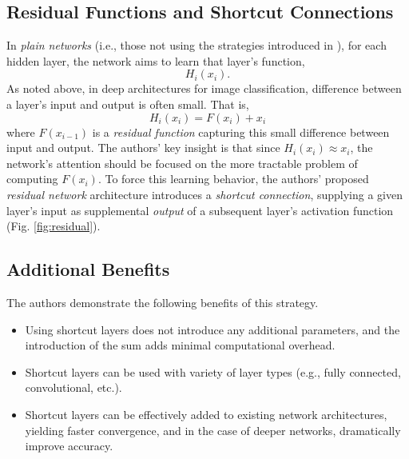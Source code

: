\documentclass[10pt]{article}
\begin{document}
\subsection*{Residual Functions and Shortcut Connections}
In \textit{plain networks} (i.e., those not using the strategies introduced in \cite{7780459}), for each hidden layer, the network aims to learn that layer's function,
\[
    H_i(x_{i}).
\]
As noted above, in deep architectures for image classification, difference between a layer's input and output is often small. That is,
\[
    H_i(x_{i}) = F(x_{i}) + x_{i}
\]
where \(F(x_{i-1})\) is a \textit{residual function} capturing this small difference between input and output. The authors' key insight is that since \(H_i(x_{i}) \approx x_{i}\), the network's attention should be focused on the more tractable problem of computing \(F(x_{i})\). To force this learning behavior, the authors' proposed \textit{residual network} architecture introduces a \textit{shortcut connection}, supplying a given layer's input as supplemental \textit{output} of a subsequent layer's activation function (Fig. \ref*{fig:residual}).


\subsection*{Additional Benefits}
The authors demonstrate the following benefits of this strategy.
\begin{itemize}
    \item Using shortcut layers does not introduce any additional parameters, and the introduction of the sum adds minimal computational overhead.
    \item Shortcut layers can be used with variety of layer types (e.g., fully connected, convolutional, etc.).
    \item Shortcut layers can be effectively added to existing network architectures, yielding faster convergence, and in the case of deeper networks, dramatically improve accuracy.
\end{itemize}
\end{document}
